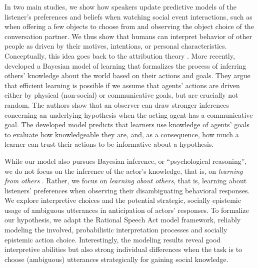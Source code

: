 \documentclass[10pt,a4paper]{article}
\begin{document}
In two main studies, we show how speakers update predictive models of the listener's preferences and beliefs when watching social event interactions, such as when offering a few objects to choose from and observing the object choice of the conversation partner. 
We thus show that humans can interpret behavior of other people as driven by their motives, intentions, or personal characteristics.
Conceptually, this idea goes back to the attribution theory \cite{jones1965acts, kelley1967attribution, kelley1970social}.
More recently,  developed a Bayesian model of learning that formalizes the process of inferring others' knowledge about the world based on their actions and goals. They argue that efficient learning is possible if we assume that agents' actions are driven either by physical (non-social) or communicative goals, but are crucially not random. The authors show that an observer can draw stronger inferences concerning an underlying hypothesis when the acting agent has a communicative goal.
The developed model predicts that learners use knowledge of agents' goals to evaluate how knowledgeable they are, and, as a consequence, how much a learner can trust their actions to be informative about a hypothesis.
 

While our model also pursues Bayesian inference, or ``psychological reasoning'', we do not focus on the inference of the actor's knowledge, that is, on \emph{learning from others} \cite{shafto2012learning}.
Rather, we focus on \emph{learning about others}, that is, learning about listeners' preferences when observing their disambiguating behavioral responses.
We explore interpretive choices and the potential strategic, socially epistemic usage of ambiguous utterances in anticipation of actors' responses. 
To formalize our hypothesis, we adapt the Rational Speech Act model framework, reliably modeling the involved, probabilistic interpretation processes and socially epistemic action choice. 
Interestingly, the modeling results reveal good interpretive abilities but also strong individual differences when the task is to choose (ambiguous) utterances strategically for gaining social knowledge. 


\end{document}
